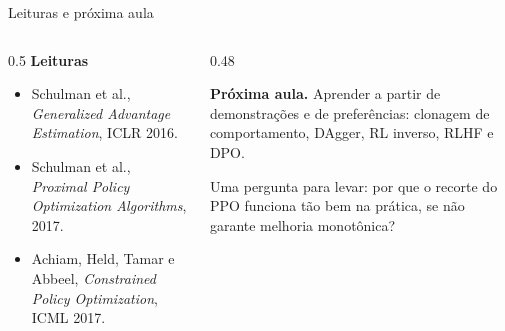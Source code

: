 \documentclass[aspectratio=169, 10pt]{beamer}
\begin{document}
\begin{frame}{Leituras e próxima aula}

  \begin{columns}[T]
  \begin{column}{0.5\textwidth}
    \textbf{Leituras}
    \begin{itemize}\setlength{\itemsep}{0.2ex}\small
      \item Schulman et al., \emph{Generalized Advantage Estimation}, ICLR 2016.
      \item Schulman et al., \emph{Proximal Policy Optimization Algorithms}, 2017.
      \item Achiam, Held, Tamar e Abbeel, \emph{Constrained Policy Optimization}, ICML 2017.
    \end{itemize}
  \end{column}
  \begin{column}{0.48\textwidth}
    \begin{ideiabox}
      \textbf{Próxima aula.} Aprender a partir de demonstrações e de preferências:
      clonagem de comportamento, DAgger, RL inverso, RLHF e DPO.
    \end{ideiabox}
    \begin{alertabox}
      Uma pergunta para levar: por que o recorte do PPO funciona tão bem na
      prática, se não garante melhoria monotônica?
    \end{alertabox}
  \end{column}
  \end{columns}
\end{frame}
\end{document}
